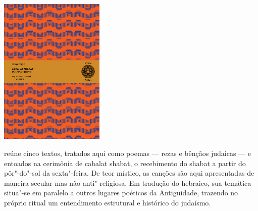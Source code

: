 \begin{center}
\hspace*{-.5cm}\includegraphics[width=50mm]{./imgs/cabalat.png}
\end{center}

\hspace*{-7cm}\hrulefill\hspace*{-7cm}

\medskip

 reúne cinco textos, tratados aqui como poemas --- rezas e bênçãos judaicas --- e entoados na cerimônia de cabalat shabat, o recebimento do shabat a partir do pôr"-do"-sol da sexta"-feira. De teor místico, as canções são aqui apresentadas de maneira secular mas não anti"-religiosa. Em tradução do hebraico, sua temática situa"-se em paralelo a outros lugares poéticos da Antiguidade, trazendo no próprio ritual um entendimento estrutural e histórico do judaísmo. %

\vfill

\hspace*{-.4cm}\begin{minipage}[c]{1\linewidth}
\small{
{}}
\end{minipage}


